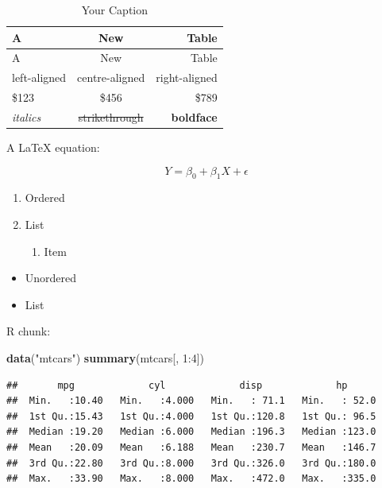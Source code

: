 \documentclass[12pt,a4paper,]{article}
\newenvironment{Shaded}{\begin{snugshade}}{\end{snugshade}}
\newcommand{\KeywordTok}[1]{\textcolor[rgb]{0.13,0.29,0.53}{\textbf{{#1}}}}
\newcommand{\DecValTok}[1]{\textcolor[rgb]{0.00,0.00,0.81}{{#1}}}
\newcommand{\StringTok}[1]{\textcolor[rgb]{0.31,0.60,0.02}{{#1}}}
\newcommand{\NormalTok}[1]{{#1}}
\providecommand{\tightlist}{%
   \setlength{\itemsep}{0pt}\setlength{\parskip}{0pt}}
\begin{document}
\begin{longtable}[]{@{}lcr@{}}
\caption{Your Caption\label{tab:tab1}}\tabularnewline
\toprule
A & New & Table\tabularnewline
\midrule
\endfirsthead
\toprule
A & New & Table\tabularnewline
\midrule
\endhead
left-aligned & centre-aligned & right-aligned\tabularnewline
\$123 & \$456 & \$789\tabularnewline
\emph{italics} & \sout{strikethrough} & \textbf{boldface}\tabularnewline
\bottomrule
\end{longtable}

A \LaTeX \hspace{.005cm} equation:

\begin{equation}
Y = \beta_{0} + \beta_{1} X + \epsilon
\end{equation}

\begin{enumerate}
\def\labelenumi{\arabic{enumi}.}
\tightlist
\item
  Ordered
\item
  List

  \begin{enumerate}
  \def\labelenumii{\arabic{enumii}.}
  \tightlist
  \item
    Item
  \end{enumerate}
\end{enumerate}

\begin{itemize}
\tightlist
\item
  Unordered
\item
  List
\end{itemize}

\newpage

R chunk:

\begin{Shaded}
\begin{Highlighting}[]
\KeywordTok{data}\NormalTok{(}\StringTok{"mtcars"}\NormalTok{)}
\KeywordTok{summary}\NormalTok{(mtcars[, }\DecValTok{1}\NormalTok{:}\DecValTok{4}\NormalTok{])}
\end{Highlighting}
\end{Shaded}

\begin{verbatim}
##       mpg             cyl             disp             hp       
##  Min.   :10.40   Min.   :4.000   Min.   : 71.1   Min.   : 52.0  
##  1st Qu.:15.43   1st Qu.:4.000   1st Qu.:120.8   1st Qu.: 96.5  
##  Median :19.20   Median :6.000   Median :196.3   Median :123.0  
##  Mean   :20.09   Mean   :6.188   Mean   :230.7   Mean   :146.7  
##  3rd Qu.:22.80   3rd Qu.:8.000   3rd Qu.:326.0   3rd Qu.:180.0  
##  Max.   :33.90   Max.   :8.000   Max.   :472.0   Max.   :335.0
\end{verbatim}
\end{document}
